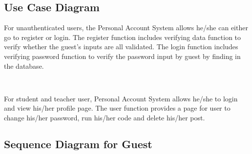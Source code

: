 \subsection{Use Case Diagram}
\begin{figure}[H]
 \label{2}
 \end{figure}
For unauthenticated users, the Personal Account System allows he/she can either go to register or login. The register function includes verifying data function to verify whether the guest's inputs are all validated. The login function includes verifying password function to verify the password input by guest by finding in the database.

~

For student and teacher user, Personal Account System allows he/she to login and view his/her profile page. The user function provides a page for user to change his/her password, run his/her code and delete his/her post.

\subsection{Sequence Diagram for Guest}
\begin{figure}[H]
 \label{3}
 \end{figure}

